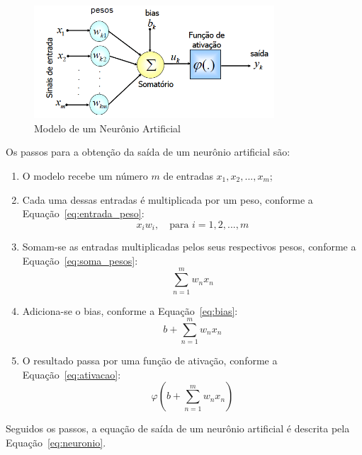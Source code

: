 \begin{figure}[H]
    \centering
    \caption{\label{fig:neuronio}Modelo de um Neurônio Artificial}
    \includegraphics[width=0.8\textwidth]{img/revisao_bibliografica/neuronio.png}
\end{figure}

Os passos para a obtenção da saída de um neurônio artificial são:

\begin{enumerate}
    \item O modelo recebe um número $m$ de entradas $x_1, x_2, ..., x_m$;
    \item Cada uma dessas entradas é multiplicada por um peso, conforme a Equação~\ref{eq:entrada_peso}:
    \begin{equation}
        x_i w_i, \quad \text{para } i = 1, 2, ..., m
        \label{eq:entrada_peso}
    \end{equation}
    \item Somam-se as entradas multiplicadas pelos seus respectivos pesos, conforme a Equação~\ref{eq:soma_pesos}:
    \begin{equation}
        \sum_{n=1}^{m} w_n x_n
        \label{eq:soma_pesos}
    \end{equation}
    \item Adiciona-se o bias, conforme a Equação~\ref{eq:bias}:
    \begin{equation}
        b + \sum_{n=1}^{m} w_n x_n
        \label{eq:bias}
    \end{equation}
    \item O resultado passa por uma função de ativação, conforme a Equação~\ref{eq:ativacao}:
    \begin{equation}
        \varphi \left( b + \sum_{n=1}^{m} w_n x_n \right)
        \label{eq:ativacao}
    \end{equation}
\end{enumerate}

Seguidos os passos, a equação de saída de um neurônio artificial é descrita pela Equação~\ref{eq:neuronio}.

